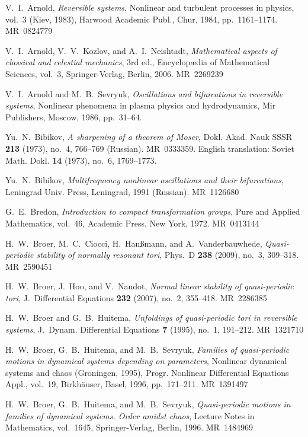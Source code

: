 \documentclass[12pt,reqno]{amsart}
\theoremstyle{definition}
\begin{document}
\begin{thebibliography}{99}

V.~I.~Arnold, \emph{Reversible systems}, Nonlinear and turbulent processes in
physics, vol.~3 (Kiev, 1983), Harwood Academic Publ., Chur, 1984,
pp.~1161--1174. MR~0824779

V.~I.~Arnold, V.~V.~Kozlov, and A.~I.~Neishtadt, \emph{Mathematical aspects of
classical and celestial mechanics}, 3rd ed., Encyclop{\ae}dia of Mathematical
Sciences, vol.~3, Springer-Verlag, Berlin, 2006. MR~2269239

V.~I.~Arnold and M.~B.~Sevryuk, \emph{Oscillations and bifurcations in
reversible systems}, Nonlinear phenomena in plasma physics and hydrodynamics,
Mir Publishers, Moscow, 1986, pp.~31--64.

Yu.~N.~Bibikov, \emph{A sharpening of a theorem of Moser}, Dokl. Akad. Nauk
SSSR \textbf{213} (1973), no.~4, 766--769 (Russian). MR~0333359. English
translation: Soviet Math. Dokl. \textbf{14} (1973), no.~6, 1769--1773.

Yu.~N.~Bibikov, \emph{Multifrequency nonlinear oscillations and their
bifurcations}, Leningrad Univ. Press, Leningrad, 1991 (Russian). MR~1126680

G.~E.~Bredon, \emph{Introduction to compact transformation groups}, Pure and
Applied Mathematics, vol.~46, Academic Press, New York, 1972. MR~0413144

H.~W.~Broer, M.~C.~Ciocci, H.~Han{\ss}mann, and A.~Vanderbauwhede,
\emph{Quasi-periodic stability of normally resonant tori}, Phys.~D
\textbf{238} (2009), no.~3, 309--318. MR~2590451

H.~W.~Broer, J.~Hoo, and V.~Naudot, \emph{Normal linear stability of
quasi-periodic tori}, J.~Differential Equations \textbf{232} (2007), no.~2,
355--418. MR~2286385

H.~W.~Broer and G.~B.~Huitema, \emph{Unfoldings of quasi-periodic tori in
reversible systems}, J.~Dynam. Differential Equations \textbf{7} (1995),
no.~1, 191--212. MR~1321710

H.~W.~Broer, G.~B.~Huitema, and M.~B.~Sevryuk, \emph{Families of
quasi-periodic motions in dynamical systems depending on parameters},
Nonlinear dynamical systems and chaos (Groningen, 1995), Progr. Nonlinear
Differential Equations Appl., vol.~19, Birkh\"auser, Basel, 1996,
pp.~171--211. MR~1391497

H.~W.~Broer, G.~B.~Huitema, and M.~B.~Sevryuk, \emph{Quasi-periodic motions in
families of dynamical systems. Order amidst chaos}, Lecture Notes in
Mathematics, vol.~1645, Springer-Verlag, Berlin, 1996. MR~1484969


\end{thebibliography}
\end{document}
